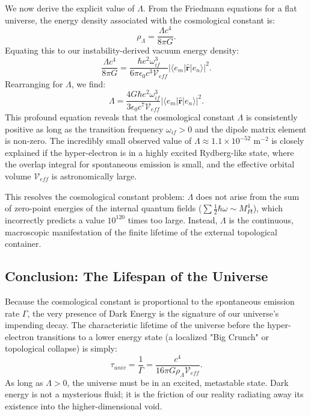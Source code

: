 We now derive the explicit value of $\Lambda$. From the Friedmann equations for a flat universe, the energy density associated with the cosmological constant is:
\begin{equation}
    \rho_\Lambda = \frac{\Lambda c^4}{8\pi G}.
\end{equation}
Equating this to our instability-derived vacuum energy density:
\begin{equation}
    \frac{\Lambda c^4}{8\pi G} = \frac{\hbar e^2 \omega_{if}^3}{6 \pi \epsilon_0 c^3 \mathcal{V}_{eff}} |\langle e_m | \hat{\mathbf{r}} | e_n \rangle|^2.
\end{equation}
Rearranging for $\Lambda$, we find:
\begin{equation}
    \Lambda = \frac{4 G \hbar e^2 \omega_{if}^3}{3 \epsilon_0 c^7 \mathcal{V}_{eff}} |\langle e_m | \hat{\mathbf{r}} | e_n \rangle|^2.
\end{equation}
This profound equation reveals that the cosmological constant $\Lambda$ is consistently positive as long as the transition frequency $\omega_{if} > 0$ and the dipole matrix element is non-zero. The incredibly small observed value of $\Lambda \approx 1.1 \times 10^{-52} \text{ m}^{-2}$ is closely explained if the hyper-electron is in a highly excited Rydberg-like state, where the overlap integral for spontaneous emission is small, and the effective orbital volume $\mathcal{V}_{eff}$ is astronomically large. 

This resolves the cosmological constant problem: $\Lambda$ does not arise from the sum of zero-point energies of the internal quantum fields ($\sum \frac{1}{2}\hbar \omega \sim M_{Pl}^4$), which incorrectly predicts a value $10^{120}$ times too large. Instead, $\Lambda$ is the continuous, macroscopic manifestation of the finite lifetime of the external topological container.

\subsection{Conclusion: The Lifespan of the Universe}

Because the cosmological constant is proportional to the spontaneous emission rate $\Gamma$, the very presence of Dark Energy is the signature of our universe's impending decay. The characteristic lifetime of the universe before the hyper-electron transitions to a lower energy state (a localized "Big Crunch" or topological collapse) is simply:
\begin{equation}
    \tau_{univ} = \frac{1}{\Gamma} = \frac{c^4}{16 \pi G \rho_\Lambda \mathcal{V}_{eff}}.
\end{equation}
As long as $\Lambda > 0$, the universe must be in an excited, metastable state. Dark energy is not a mysterious fluid; it is the friction of our reality radiating away its existence into the higher-dimensional void.



